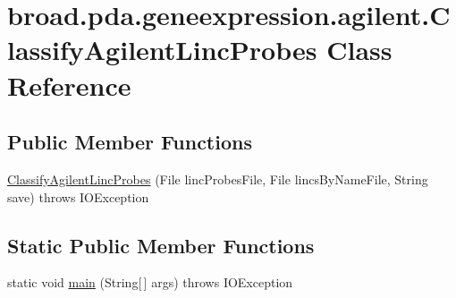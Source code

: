 \hypertarget{classbroad_1_1pda_1_1geneexpression_1_1agilent_1_1_classify_agilent_linc_probes}{\section{broad.\+pda.\+geneexpression.\+agilent.\+Classify\+Agilent\+Linc\+Probes Class Reference}
\label{classbroad_1_1pda_1_1geneexpression_1_1agilent_1_1_classify_agilent_linc_probes}
}
\subsection*{Public Member Functions}
\begin{DoxyCompactItemize}
\item 
\hyperlink{classbroad_1_1pda_1_1geneexpression_1_1agilent_1_1_classify_agilent_linc_probes_a274f182a83c3032b230022d1789bafc1}{Classify\+Agilent\+Linc\+Probes} (File linc\+Probes\+File, File lincs\+By\+Name\+File, String save)  throws I\+O\+Exception
\end{DoxyCompactItemize}
\subsection*{Static Public Member Functions}
\begin{DoxyCompactItemize}
\item 
static void \hyperlink{classbroad_1_1pda_1_1geneexpression_1_1agilent_1_1_classify_agilent_linc_probes_a87e352f7838c261d30e5505149ec6e6d}{main} (String\mbox{[}$\,$\mbox{]} args)  throws I\+O\+Exception
\end{DoxyCompactItemize}



